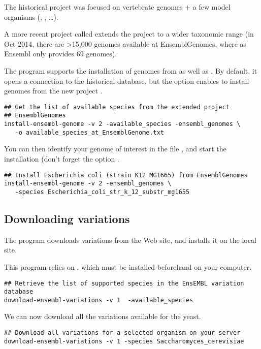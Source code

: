 The historical \ensembl project 
was focused on vertebrate genomes + a few model organisms
(, ,
\ldots).

A more recent project called \ensemblgenomes
{} extends the \ensembl project to a
wider taxonomic range (in Oct 2014, there are >15,000 genomes
available at EnsemblGenomes, where as Ensembl only provides 69
genomes).

The program  supports the installation
of genomes from \ensembl as well as \ensemblgenomes. By default, it
opens a connection to the historical \ensembl database, but the option
 enables to install genomes from the new
project \ensemblgenomes.

\begin{lstlisting}
## Get the list of available species from the extended project
## EnsemblGenomes
install-ensembl-genome -v 2 -available_species -ensembl_genomes \
   -o available_species_at_EnsemblGenome.txt
\end{lstlisting}

You can then identify your genome of interest in the file
, and start the
installation (don't forget the option \option{-ensembl\_genomes}.

\begin{lstlisting}
## Install Escherichia coli (strain K12 MG1665) from EnsemblGenomes
install-ensembl-genome -v 2 -ensembl_genomes \
   -species Escherichia_coli_str_k_12_substr_mg1655
\end{lstlisting}


\subsection{Downloading variations}
\label{sect:download_ensembl_variations}

The program  downloads variations
from the \ensembl Web site, and installs it on the local \RSAT
site. 

This program relies on , which must be installed
beforehand on your computer.

\begin{lstlisting}
## Retrieve the list of supported species in the EnsEMBL variation database
download-ensembl-variations -v 1  -available_species
\end{lstlisting}

We can now download all the variations available for the yeast.

\begin{lstlisting}
## Download all variations for a selected organism on your server
download-ensembl-variations -v 1 -species Saccharomyces_cerevisiae
\end{lstlisting}
